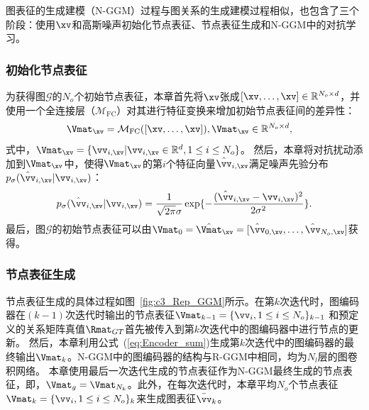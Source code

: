 
图表征的生成建模（N-GGM）过程与图关系的生成建模过程相似，也包含了三个阶段：使用$\xv$和高斯噪声初始化节点表征、节点表征生成和N-GGM中的对抗学习。

\subsubsection{初始化节点表征}
为获得图$\mathcal{G}$的$N_o$个初始节点表征，本章首先将$\xv$张成$[\xv, \dots, \xv] \in \mathbb{R}^{N_o\times d}$，并使用一个全连接层（$\mathcal{M}_{\text{FC}}$）对其进行特征变换来增加初始节点表征间的差异性：
\begin{equation}
\begin{aligned}
\Vmat_{\xv} &= \mathcal{M}_{\text{FC}} ([\xv, \dots, \xv]), \Vmat_{\xv} \in \mathbb{R}^{N_o\times d},  
\end{aligned}
\end{equation}
式中，$\Vmat_{\xv}=\{\vv_{i,\xv} | \vv_{i,\xv} \in \mathbb{R}^{d}, 1\le i\le N_o \}$。
然后，本章将对抗扰动添加到$\Vmat_{\xv}$中，使得$\Vmat_{\xv}$的第$i$个特征向量$\hat{\vv}_{i, \xv}$满足噪声先验分布$p_{\sigma}(\hat{\vv}_{i, \xv} | \vv_{i, \xv})$：
\begin{equation}
\begin{aligned}
p_{\sigma}(\hat{\vv}_{i, \xv} | \vv_{i, \xv}) = \frac{1}{\sqrt{2\pi}\sigma}\exp \{-\frac{(\hat{\vv}_{i, \xv} - \vv_{i, \xv})^2}{2\sigma^2} \}. 
\end{aligned}
\end{equation}
最后，图$\mathcal{G}$的初始节点表征可以由$\Vmat_0 = \hat{\Vmat}_{\xv} = [\hat{\vv}_{0,\xv}, \dots, \hat{\vv}_{N_o,\xv}]$获得。


\subsubsection{节点表征生成}
节点表征生成的具体过程如图~\ref{fig:c3_Rep_GGM}所示。在第$k$次迭代时，图编码器在$(k-1)$次迭代时输出的节点表征$\Vmat_{k-1}= \{\vv_i, 1 \le i \le N_o \}_{k-1}$ 和预定义的关系矩阵真值$\Rmat_{GT}$首先被传入到第$k$次迭代中的图编码器中进行节点的更新。
然后，本章利用公式~(\ref{eq:Encoder_sum})生成第$k$次迭代中的图编码器的最终输出$\Vmat_k$。N-GGM中的图编码器的结构与R-GGM中相同，均为$N_l$层的图卷积网络。
本章使用最后一次迭代生成的节点表征作为N-GGM最终生成的节点表征，即，$\Vmat_g = \Vmat_{N_k}$。此外，在每次迭代时，本章平均$N_o$个节点表征$\Vmat_{k}= \{\vv_i, 1 \le i \le N_o \}_{k}$来生成图表征$\bar{\vv}_k$。




